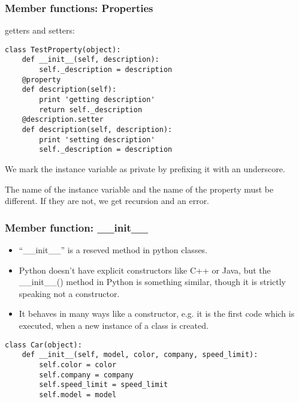 \begin{frame}[fragile]\frametitle{Member functions: Properties}
getters and setters:
\begin{lstlisting}
class TestProperty(object):
    def __init__(self, description):
        self._description = description
    @property
    def description(self):
        print 'getting description'
        return self._description
    @description.setter
    def description(self, description):
        print 'setting description'
        self._description = description
\end{lstlisting}
We mark the instance variable as private by prefixing it with an underscore.

The name of the instance variable and the name of the property must be different. If they are not, we get recursion and an error.
\end{frame}

\begin{frame}[fragile]\frametitle{Member function: \_\_init\_\_}
   \begin{itemize}
  \item ``\_\_init\_\_'' is a reseved method in python classes. 
  \item Python doesn't have explicit constructors like C++ or Java, but the \_\_init\_\_() method in Python is something similar, though it is strictly speaking not a constructor. 
  \item It behaves in many ways like a constructor, e.g. it is the first code which is executed, when a new instance of a class is created.
   \end{itemize}
   
\begin{lstlisting}
class Car(object):
	def __init__(self, model, color, company, speed_limit):
		self.color = color
		self.company = company
		self.speed_limit = speed_limit
		self.model = model

\end{lstlisting}

\end{frame}

